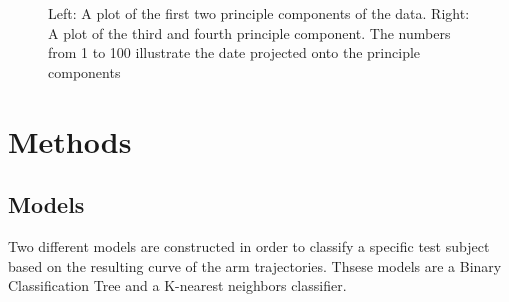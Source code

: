 \documentclass[11pt, fleqn, titlepage]{article}
\begin{document}
\begin{figure}[H]
	\centering
	\qquad
	\caption{Left: A plot of the first two principle components of the data. Right: A plot of the third and fourth principle component. The numbers from 1 to 100 illustrate the date projected onto the principle components}%
	\label{fig:example}%
\end{figure}


\section{Methods}

\subsection*{Models}
Two different models are constructed in order to classify a specific test subject based on the resulting curve of the arm trajectories. Thsese models are a Binary Classification Tree and a K-nearest neighbors classifier.
\end{document}

